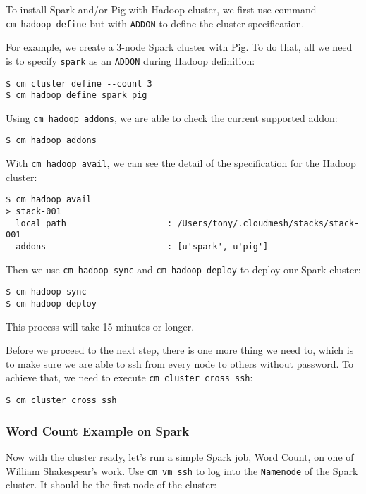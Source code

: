 To install Spark and/or Pig with Hadoop cluster, we first use command
\texttt{cm\ hadoop\ define} but with \texttt{ADDON} to define the
cluster specification.

For example, we create a 3-node Spark cluster with Pig. To do that, all
we need is to specify \texttt{spark} as an \texttt{ADDON} during Hadoop
definition:

\begin{verbatim}
$ cm cluster define --count 3
$ cm hadoop define spark pig
\end{verbatim}

Using \texttt{cm\ hadoop\ addons}, we are able to check the current
supported addon:

\begin{verbatim}
$ cm hadoop addons
\end{verbatim}

With \texttt{cm\ hadoop\ avail}, we can see the detail of the
specification for the Hadoop cluster:

\begin{verbatim}
$ cm hadoop avail
> stack-001
  local_path                    : /Users/tony/.cloudmesh/stacks/stack-001
  addons                        : [u'spark', u'pig']
\end{verbatim}

Then we use \texttt{cm\ hadoop\ sync} and \texttt{cm\ hadoop\ deploy} to
deploy our Spark cluster:

\begin{verbatim}
$ cm hadoop sync
$ cm hadoop deploy
\end{verbatim}

This process will take 15 minutes or longer.

Before we proceed to the next step, there is one more thing we need to,
which is to make sure we are able to ssh from every node to others
without password. To achieve that, we need to execute
\texttt{cm\ cluster\ cross\_ssh}:

\begin{verbatim}
$ cm cluster cross_ssh
\end{verbatim}

\subsubsection{Word Count Example on
Spark}\label{word-count-example-on-spark}

Now with the cluster ready, let's run a simple Spark job, Word Count, on
one of William Shakespear's work. Use \texttt{cm\ vm\ ssh} to log into
the \texttt{Namenode} of the Spark cluster. It should be the first node
of the cluster:

